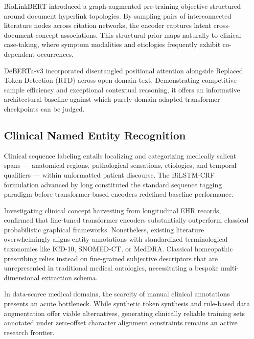 BioLinkBERT \cite{yasunaga2022linkbert} introduced a graph-augmented pre-training objective structured around document hyperlink topologies. By sampling pairs of interconnected literature nodes across citation networks, the encoder captures latent cross-document concept associations. This structural prior maps naturally to clinical case-taking, where symptom modalities and etiologies frequently exhibit co-dependent occurrences.

DeBERTa-v3 \cite{he2021deberta} incorporated disentangled positional attention alongside Replaced Token Detection (RTD) across open-domain text. Demonstrating competitive sample efficiency and exceptional contextual reasoning, it offers an informative architectural baseline against which purely domain-adapted transformer checkpoints can be judged.

\subsection{Clinical Named Entity Recognition}

Clinical sequence labeling entails localizing and categorizing medically salient spans --- anatomical regions, pathological sensations, etiologies, and temporal qualifiers --- within unformatted patient discourse. The BiLSTM-CRF formulation advanced by \citeauthor{lample2016neural} \cite{lample2016neural} long constituted the standard sequence tagging paradigm before transformer-based encoders redefined baseline performance.

Investigating clinical concept harvesting from longitudinal EHR records, \citeauthor{jagannatha2019overview} \cite{jagannatha2019overview} confirmed that fine-tuned transformer encoders substantially outperform classical probabilistic graphical frameworks. Nonetheless, existing literature overwhelmingly aligns entity annotations with standardized terminological taxonomies like ICD-10, SNOMED-CT, or MedDRA. Classical homeopathic prescribing relies instead on fine-grained subjective descriptors that are unrepresented in traditional medical ontologies, necessitating a bespoke multi-dimensional extraction schema.

In data-scarce medical domains, the scarcity of manual clinical annotations presents an acute bottleneck. While synthetic token synthesis \cite{he2023annollm} and rule-based data augmentation \cite{wei2019eda} offer viable alternatives, generating clinically reliable training sets annotated under zero-offset character alignment constraints remains an active research frontier.

